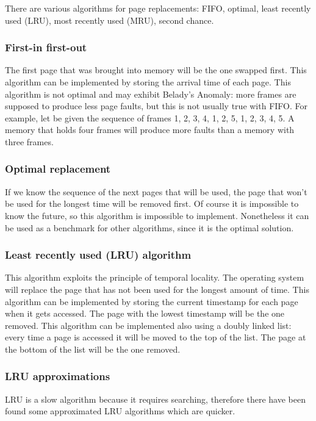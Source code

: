 There are various algorithms for page replacements: FIFO, optimal, least recently used (LRU), most recently used (MRU), second chance.

\subsubsection{First-in first-out}
The first page that was brought into memory will be the one swapped first. This algorithm can be implemented by storing the arrival time of each page. This algorithm is not optimal and may exhibit Belady's Anomaly: more frames are supposed to produce less page faults, but this is not usually true with FIFO. For example, let be given the sequence of frames 1, 2, 3, 4, 1, 2, 5, 1, 2, 3, 4, 5. A memory that holds four frames will produce more faults than a memory with three frames.

\subsubsection{Optimal replacement}
If we know the sequence of the next pages that will be used, the page that won't be used for the longest time will be removed first. Of course it is impossible to know the future, so this algorithm is impossible to implement. Nonetheless it can be used as a benchmark for other algorithms, since it is the optimal solution.

\subsubsection{Least recently used (LRU) algorithm}
This algorithm exploits the principle of temporal locality. The operating system will replace the page that has not been used for the longest amount of time. This algorithm can be implemented by storing the current timestamp for each page when it gets accessed. The page with the lowest timestamp will be the one removed. This algorithm can be implemented also using a doubly linked list: every time a page is accessed it will be moved to the top of the list. The page at the bottom of the list will be the one removed.

\subsubsection{LRU approximations}
LRU is a slow algorithm because it requires searching, therefore there have been found some approximated LRU algorithms which are quicker.

